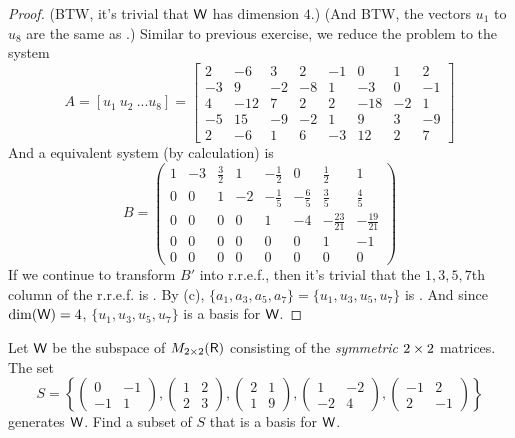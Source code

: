 \begin{proof}
(BTW, it's trivial that \(\textsf{W}\) has dimension \(4\).)
(And BTW, the vectors \(u_1\) to \(u_8\) are the same as .)
Similar to previous exercise, we reduce the problem to the system
\[
    A = [u_1\ u_2\ ... u_8] =
    \left[\begin{array}{cccccccc}
        2 & -6 & 3 & 2 & -1 & 0 & 1 & 2 \\
        -3 & 9 & -2 & -8 & 1 & -3 & 0 & -1 \\
        4 & -12 & 7 & 2 & 2 & -18 & -2 & 1 \\
        -5 & 15 & -9 & -2 & 1 & 9 & 3 & -9 \\
        2 & -6 & 1 & 6 & -3 & 12 & 2 & 7
    \end{array}\right]
\]
And a equivalent system (by calculation) is
\[
    B = \left(\begin{array}{cccccccc}
        1 & -3 & \frac{3}{2} & 1 & -\frac{1}{2} & 0 & \frac{1}{2} & 1 \\
        0 & 0 & 1 & -2 & -\frac{1}{5} & -\frac{6}{5} & \frac{3}{5} & \frac{4}{5} \\
        0 & 0 & 0 & 0 & 1 & -4 & -\frac{23}{21} & -\frac{19}{21} \\
        0 & 0 & 0 & 0 & 0 & 0 & 1 & -1 \\
        0 & 0 & 0 & 0 & 0 & 0 & 0 & 0
    \end{array}\right)
\]
If we continue to transform \(B'\) into r.r.e.f., then it's trivial that the \(1, 3, 5, 7\)th column of the r.r.e.f. is \LID{}.
By (c), \(\{ a_1, a_3, a_5, a_7 \} =\{ u_1, u_3, u_5, u_7 \}\) is \LID{}.
And since \(\dim(\textsf{W}) = 4\), \(\{ u_1, u_3, u_5, u_7 \}\) is a basis for \(\textsf{W}\).
\end{proof}

\begin{exercise} \label{exercise 3.4.9}
Let \(\textsf{W}\) be the subspace of \(M_{2 \times 2}(\textsf{R})\) consisting of the \emph{symmetric} \(2 \times 2\) matrices.
The set
\[
    S= \left\{
        \left(\begin{array}{rr}
            0 & -1 \\
            -1 & 1
        \end{array}\right),
        \left(\begin{array}{ll}
            1 & 2 \\
            2 & 3
        \end{array}\right),
        \left(\begin{array}{ll}
            2 & 1 \\
            1 & 9
        \end{array}\right),
        \left(\begin{array}{rr}
            1 & -2 \\
            -2 & 4
        \end{array}\right),
        \left(\begin{array}{rr}
            -1 & 2 \\
            2 & -1
        \end{array}\right)
    \right\}
\]
generates \(\textsf{W}\).
Find a subset of \(S\) that is a basis for \(\textsf{W}\).
\end{exercise}

